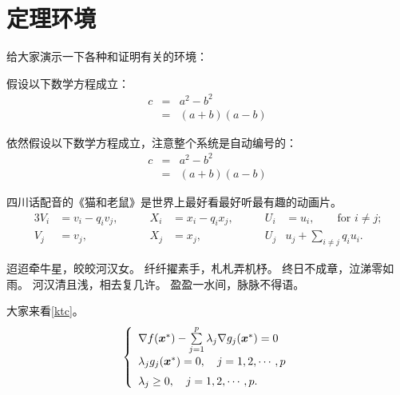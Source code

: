 \section{定理环境}
\label{sec:theorem}

给大家演示一下各种和证明有关的环境：

\begin{assumption}
    假设以下数学方程成立：
    \begin{eqnarray}
    \label{eq:eqnxmp}
    c & = & a^2 - b^2\\
    & = & (a+b)(a-b)
    \end{eqnarray}
\end{assumption}

\begin{assumption}
    依然假设以下数学方程成立，注意整个系统是自动编号的：
    \begin{eqnarray}
    \label{eq:eqnxmp2}
    c & = & a^2 - b^2\\
    & = & (a+b)(a-b)
    \end{eqnarray}
\end{assumption}

\begin{cor}
    四川话配音的《猫和老鼠》是世界上最好看最好听最有趣的动画片。
    \begin{alignat}{3}
    V_i & =v_i - q_i v_j, & \qquad X_i & = x_i - q_i x_j,
    & \qquad U_i & = u_i,
    \qquad \text{for $i\ne j$;}\label{eq:B}\\
    V_j & = v_j, & \qquad X_j & = x_j,
    & \qquad U_j & u_j + \sum_{i\ne j} q_i u_i.
    \end{alignat}
\end{cor}

迢迢牵牛星，皎皎河汉女。
纤纤擢素手，札札弄机杼。
终日不成章，泣涕零如雨。
河汉清且浅，相去复几许。
盈盈一水间，脉脉不得语。

\begin{exmp}
    大家来看\autoref{ktc}。
    \begin{equation}
    \label{ktc}
    \left\{\begin{array}{l}
    \nabla f({\mbox{\boldmath $x$}}^*)-\sum\limits_{j=1}^p\lambda_j\nabla g_j({\mbox{\boldmath $x$}}^*)=0\\[0.3cm]
    \lambda_jg_j({\mbox{\boldmath $x$}}^*)=0,\quad j=1,2,\cdots,p\\[0.2cm]
    \lambda_j\ge 0,\quad j=1,2,\cdots,p.
    \end{array}\right.
    \end{equation}
\end{exmp}


